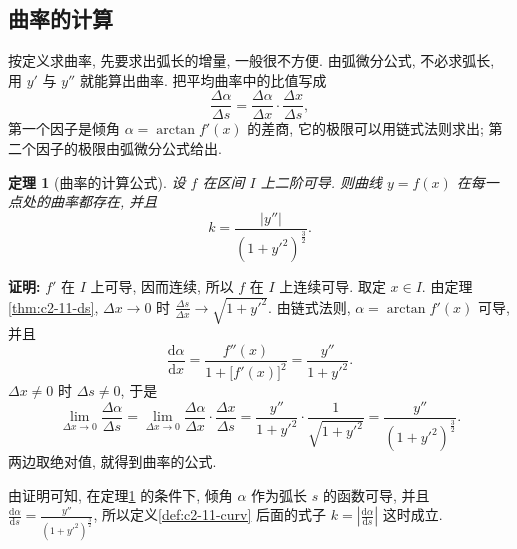 \documentclass[UTF8,openany]{ctexbook}
\theoremstyle{chinesetextbook}
\newtheorem{theorem}{定理}[section]
\newenvironment{cnproof}{\par\indent\textbf{证明:} \ignorespaces}{\par}
\newcommand{\dd}{\mathrm d}
\begin{document}
\subsection{曲率的计算}
按定义求曲率, 先要求出弧长的增量, 一般很不方便. 由弧微分公式, 不必求弧长, 用 $y'$ 与 $y''$ 就能算出曲率. 把平均曲率中的比值写成
\[
\frac{\Delta\alpha}{\Delta s}=\frac{\Delta\alpha}{\Delta x}\cdot\frac{\Delta x}{\Delta s},
\]
第一个因子是倾角 $\alpha=\arctan f'(x)$ 的差商, 它的极限可以用链式法则求出; 第二个因子的极限由弧微分公式给出.
\begin{theorem}[曲率的计算公式]\label{thm:c2-11-k}
设 $f$ 在区间 $I$ 上二阶可导. 则曲线 $y=f(x)$ 在每一点处的曲率都存在, 并且
\[
k=\frac{|y''|}{(1+y'^2)^{\frac32}}.
\]
\end{theorem}
\begin{cnproof}
$f'$ 在 $I$ 上可导, 因而连续, 所以 $f$ 在 $I$ 上连续可导. 取定 $x\in I$. 由定理\ref{thm:c2-11-ds}, $\Delta x\to0$ 时 $\displaystyle\frac{\Delta s}{\Delta x}\to\sqrt{1+y'^2}$. 由链式法则, $\alpha=\arctan f'(x)$ 可导, 并且
\[
\frac{\dd\alpha}{\dd x}=\frac{f''(x)}{1+\bigl[f'(x)\bigr]^2}=\frac{y''}{1+y'^2}.
\]
$\Delta x\ne0$ 时 $\Delta s\ne0$, 于是
\[
\lim_{\Delta x\to0}\frac{\Delta\alpha}{\Delta s}=\lim_{\Delta x\to0}\frac{\Delta\alpha}{\Delta x}\cdot\frac{\Delta x}{\Delta s}=\frac{y''}{1+y'^2}\cdot\frac1{\sqrt{1+y'^2}}=\frac{y''}{(1+y'^2)^{\frac32}}.
\]
两边取绝对值, 就得到曲率的公式.
\end{cnproof}
由证明可知, 在定理\ref{thm:c2-11-k} 的条件下, 倾角 $\alpha$ 作为弧长 $s$ 的函数可导, 并且 $\displaystyle\frac{\dd\alpha}{\dd s}=\frac{y''}{(1+y'^2)^{\frac32}}$, 所以定义\ref{def:c2-11-curv} 后面的式子 $\displaystyle k=\left|\frac{\dd\alpha}{\dd s}\right|$ 这时成立.
\end{document}
